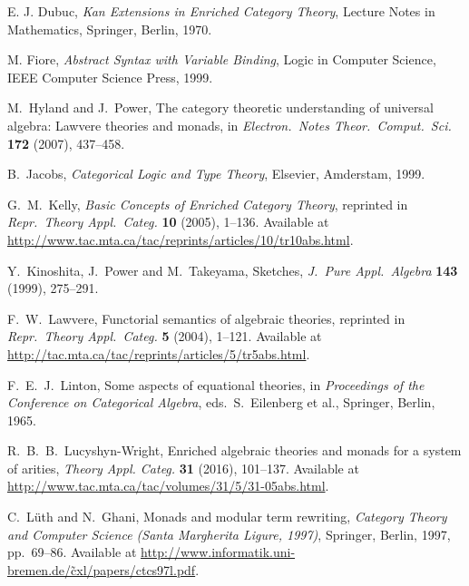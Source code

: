 \documentclass{amsart}
\theoremstyle{definition}
\begin{document}
\begin{thebibliography}{100}
 E. J. Dubuc, \textsl{Kan Extensions in Enriched Category Theory}, Lecture Notes in Mathematics, Springer, Berlin, 1970.

 M. Fiore, \textsl{Abstract Syntax with Variable Binding}, Logic in Computer Science, IEEE Computer Science Press, 1999.

 M.\ Hyland and J.\ Power, The category theoretic understanding of 
universal algebra: Lawvere theories and monads, in \textsl{Electron.\ Notes Theor.\ Comput.\ Sci.} \textbf{172} (2007), 437--458.

 B.\ Jacobs, \textsl{Categorical Logic and Type Theory}, Elsevier, Amderstam, 1999.
	
 G.\ M.\ Kelly, \textsl{Basic Concepts of Enriched Category Theory}, reprinted in \textsl{Repr.\ Theory Appl.\ Categ.} \textbf{10} (2005), 1--136.  Available at \href{http://www.tac.mta.ca/tac/reprints/articles/10/tr10abs.html}{http://www.tac.mta.ca/tac/reprints/articles/10/tr10abs.html}.

 Y.\ Kinoshita, J.\ Power and M.\ Takeyama, Sketches,
\textsl{J.\ Pure Appl.\ Algebra} \textbf{143} (1999), 275--291.

 F.\ W.\ Lawvere, Functorial semantics of algebraic theories, reprinted in
\textsl{Repr.\ Theory Appl.\ Categ.} \textbf{5} (2004), 1--121.  Available at \href{http://tac.mta.ca/tac/reprints/articles/5/tr5abs.html}{http://tac.mta.ca/tac/reprints/articles/5/tr5abs.html}.

 F.\ E.\ J.\ Linton, Some aspects of equational theories, in 
\textsl{Proceedings of the Conference on Categorical Algebra}, eds.\ S.\ Eilenberg et al.,
Springer, Berlin, 1965.

 R.\ B.\ B.\ Lucyshyn-Wright, Enriched algebraic theories and monads for a system of arities, \textsl{Theory Appl. Categ.} \textbf{31} (2016), 101--137.  Available at \href{http://www.tac.mta.ca/tac/volumes/31/5/31-05abs.html}{http://www.tac.mta.ca/tac/volumes/31/5/31-05abs.html}.
	
 C.\ L\"{u}th and N.\ Ghani, Monads and modular term rewriting,
\textsl{Category Theory and Computer Science ({S}anta {M}argherita Ligure, 1997)}, Springer, Berlin, 1997, pp.\ 69--86.  Available at \href{http://www.informatik.uni-bremen.de/~cxl/papers/ctcs97l.pdf}{http://www.informatik.uni-bremen.de/\~cxl/papers/ctcs97l.pdf}.



\end{thebibliography}
\end{document}
